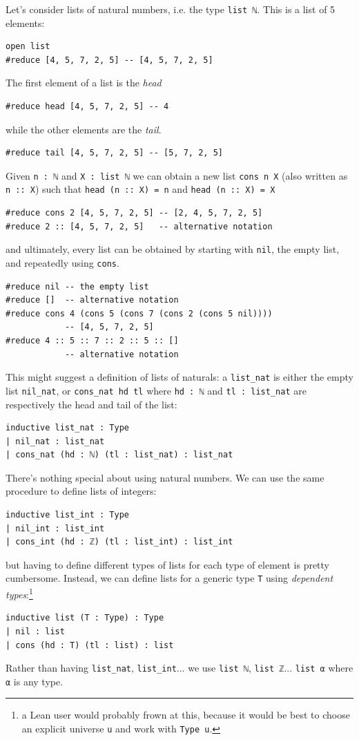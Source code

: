 \documentclass[oneside]{book}
\theoremstyle{definition}
\theoremstyle{remark}
\theoremstyle{plain}
\begin{document}
Let's consider lists of natural numbers, i.e. the type \lstinline{list ℕ}.
This is a list of 5 elements:
\begin{lstlisting}
open list
#reduce [4, 5, 7, 2, 5] -- [4, 5, 7, 2, 5]
\end{lstlisting}
The first element of a list is the \textit{head}
\begin{lstlisting}
#reduce head [4, 5, 7, 2, 5] -- 4
\end{lstlisting}
while the other elements are the \textit{tail}.
\begin{lstlisting}
#reduce tail [4, 5, 7, 2, 5] -- [5, 7, 2, 5]
\end{lstlisting}
Given \lstinline{n : ℕ} and \lstinline{X : list ℕ} we can obtain a new list
\lstinline{cons n X} (also written as \lstinline{n :: X}) such that
\lstinline{head (n :: X) = n} and \lstinline{head (n :: X) = X}
\begin{lstlisting}
#reduce cons 2 [4, 5, 7, 2, 5] -- [2, 4, 5, 7, 2, 5]
#reduce 2 :: [4, 5, 7, 2, 5]   -- alternative notation  
\end{lstlisting}
and ultimately, every list can be obtained by starting with \lstinline{nil},
the empty list, and repeatedly using \lstinline{cons}.
\begin{lstlisting}
#reduce nil -- the empty list
#reduce []  -- alternative notation 
#reduce cons 4 (cons 5 (cons 7 (cons 2 (cons 5 nil))))
            -- [4, 5, 7, 2, 5]
#reduce 4 :: 5 :: 7 :: 2 :: 5 :: []
            -- alternative notation
\end{lstlisting}
This might suggest a definition of lists of naturals:
a \lstinline{list_nat} is either the empty list \lstinline{nil_nat},
or \lstinline{cons_nat hd tl} where \lstinline{hd : ℕ} and \lstinline{tl : list_nat}
are respectively the head and tail of the list:
\begin{lstlisting}
inductive list_nat : Type
| nil_nat : list_nat
| cons_nat (hd : ℕ) (tl : list_nat) : list_nat
\end{lstlisting}
There's nothing special about using natural numbers.
We can use the same procedure to define lists of integers:
\begin{lstlisting}
inductive list_int : Type
| nil_int : list_int
| cons_int (hd : ℤ) (tl : list_int) : list_int
\end{lstlisting}
but having to define different types of lists for each type of element is pretty cumbersome.
Instead, we can define lists for a generic type \lstinline{T} using \textit{dependent types}:\footnote{a Lean user would probably frown at this,
because it would be best to choose an explicit universe \lstinline{u} and work with \lstinline{Type u}.}
\begin{lstlisting}
inductive list (T : Type) : Type
| nil : list
| cons (hd : T) (tl : list) : list
\end{lstlisting}
Rather than having \lstinline{list_nat}, \lstinline{list_int}...
we use \lstinline{list ℕ}, \lstinline{list ℤ}...
\lstinline{list α} where \lstinline{α} is any type.
\end{document}
